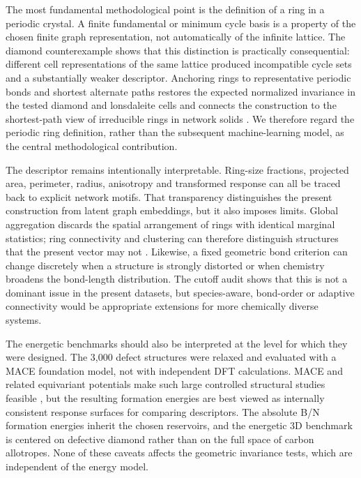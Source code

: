 \documentclass[twoside,twocolumn,9pt]{article}
\begin{document}
The most fundamental methodological point is the definition of a ring in a periodic crystal. A finite fundamental or minimum cycle basis is a property of the chosen finite graph representation, not automatically of the infinite lattice. The diamond counterexample shows that this distinction is practically consequential: different cell representations of the same lattice produced incompatible cycle sets and a substantially weaker descriptor. Anchoring rings to representative periodic bonds and shortest alternate paths restores the expected normalized invariance in the tested diamond and lonsdaleite cells and connects the construction to the shortest-path view of irreducible rings in network solids \cite{Franzblau1991,LeRoux2010}. We therefore regard the periodic ring definition, rather than the subsequent machine-learning model, as the central methodological contribution.

The descriptor remains intentionally interpretable. Ring-size fractions, projected area, perimeter, radius, anisotropy and transformed response can all be traced back to explicit network motifs. That transparency distinguishes the present construction from latent graph embeddings, but it also imposes limits. Global aggregation discards the spatial arrangement of rings with identical marginal statistics; ring connectivity and clustering can therefore distinguish structures that the present vector may not \cite{Jain2007}. Likewise, a fixed geometric bond criterion can change discretely when a structure is strongly distorted or when chemistry broadens the bond-length distribution. The cutoff audit shows that this is not a dominant issue in the present datasets, but species-aware, bond-order or adaptive connectivity would be appropriate extensions for more chemically diverse systems.

The energetic benchmarks should also be interpreted at the level for which they were designed. The 3,000 defect structures were relaxed and evaluated with a MACE foundation model, not with independent DFT calculations. MACE and related equivariant potentials make such large controlled structural studies feasible \cite{Batatia2022,Batatia2025}, but the resulting formation energies are best viewed as internally consistent response surfaces for comparing descriptors. The absolute B/N formation energies inherit the chosen reservoirs, and the energetic 3D benchmark is centered on defective diamond rather than on the full space of carbon allotropes. None of these caveats affects the geometric invariance tests, which are independent of the energy model.
\end{document}
